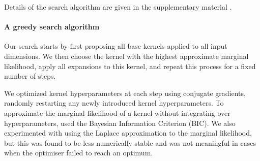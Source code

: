 \documentclass[twoside]{article}
\begin{document}

Details of the search algorithm are given in the supplementary material .

\paragraph{A greedy search algorithm}
Our search starts by first proposing all base kernels applied to all input dimensions.  We then choose the kernel with the highest approximate marginal likelihood, apply all expansions to this kernel, and repeat this process for a fixed number of steps.

We optimized kernel hyperparameters at each step using conjugate gradients, randomly restarting any newly introduced kernel hyperparameters.  To approximate the marginal likelihood of a kernel without integrating over hyperparameters, used the Bayesian Information Criterion (BIC)\footnotemark {}.
We also experimented with using the Laplace approximation to the marginal likelihood, but this was found to be less numerically stable and was not meaningful in cases when the optimiser failed to reach an optimum.
\end{document}
